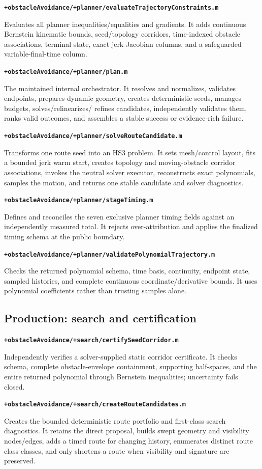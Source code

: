 \documentclass[10pt,letterpaper]{article}
\newcommand{\file}[1]{\nolinkurl{#1}}
\newcommand{\scriptentry}[2]{%
  \par\medskip\noindent\textbf{\file{#1}}\par
  \begingroup\raggedright #2\par\endgroup
}
\begin{document}
\scriptentry{+obstacleAvoidance/+planner/evaluateTrajectoryConstraints.m}{Evaluates
all planner inequalities/equalities and gradients. It adds continuous
Bernstein kinematic bounds, seed/topology corridors, time-indexed obstacle
associations, terminal state, exact jerk Jacobian columns, and a safeguarded
variable-final-time column.}

\scriptentry{+obstacleAvoidance/+planner/plan.m}{The maintained internal
orchestrator. It resolves and normalizes, validates endpoints, prepares dynamic
geometry, creates deterministic seeds, manages budgets, solves/relinearizes/
refines candidates, independently validates them, ranks valid outcomes, and
assembles a stable success or evidence-rich failure.}

\scriptentry{+obstacleAvoidance/+planner/solveRouteCandidate.m}{Transforms one
route seed into an HS3 problem. It sets mesh/control layout, fits a bounded jerk
warm start, creates topology and moving-obstacle corridor associations, invokes
the neutral solver executor, reconstructs exact polynomials, samples the motion,
and returns one stable candidate and solver diagnostics.}

\scriptentry{+obstacleAvoidance/+planner/stageTiming.m}{Defines and reconciles
the seven exclusive planner timing fields against an independently measured
total. It rejects over-attribution and applies the finalized timing schema at
the public boundary.}

\scriptentry{+obstacleAvoidance/+planner/validatePolynomialTrajectory.m}{Checks
the returned polynomial schema, time basis, continuity, endpoint state,
sampled histories, and complete continuous coordinate/derivative bounds. It
uses polynomial coefficients rather than trusting samples alone.}

\subsection{Production: search and certification}

\scriptentry{+obstacleAvoidance/+search/certifySeedCorridor.m}{Independently
verifies a solver-supplied static corridor certificate. It checks schema,
complete obstacle-envelope containment, supporting half-spaces, and the entire
returned polynomial through Bernstein inequalities; uncertainty fails closed.}

\scriptentry{+obstacleAvoidance/+search/createRouteCandidates.m}{Creates the
bounded deterministic route portfolio and first-class search diagnostics. It
retains the direct proposal, builds swept geometry and visibility nodes/edges,
adds a timed route for changing history, enumerates distinct route class classes,
and only shortens a route when visibility and signature are preserved.}
\end{document}

